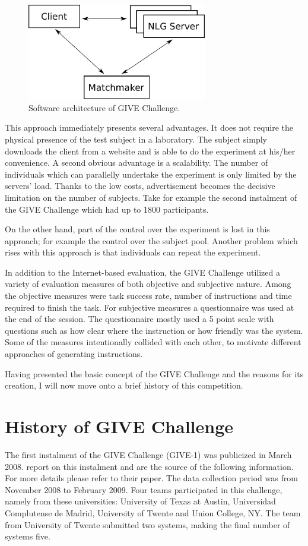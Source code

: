 \begin{figure}[!htbp]
  \centering
	\includegraphics[width=0.7\textwidth]{Images/give-client-servers}
	\caption{Software architecture of GIVE Challenge.}
	\label{fig:give-clientserver}
\end{figure}

This approach immediately presents several advantages. It does not require the physical presence of the test subject in a laboratory. The subject simply downloads the client from a website and is able to do the experiment at his/her convenience. A second obvious advantage is a scalability. The number of individuals which can parallelly undertake the experiment is only limited by the servers' load. Thanks to the low costs, advertisement becomes the decisive limitation on the number of subjects. Take for example the second instalment of the GIVE Challenge which had up to 1800 participants.

On the other hand, part of the control over the experiment is lost in this approach; for example the control over the subject pool. Another problem which rises with this approach is that individuals can repeat the experiment.

In addition to the Internet-based evaluation, the GIVE Challenge utilized a variety of evaluation measures of both objective and subjective nature. Among the objective measures were task success rate, number of instructions and time required to finish the task. For subjective measures a questionnaire was used at the end of the session. The questionnaire mostly used a 5 point scale with questions such as how clear where the instruction or how friendly was the system. Some of the measures intentionally collided with each other, to motivate different approaches of generating instructions.

Having presented the basic concept of the GIVE Challenge and the reasons for its creation, I will now move onto a brief history of this competition. 

 
\section{History of GIVE Challenge}
The first instalment of the GIVE Challenge (GIVE-1) was publicized in March 2008. \citet{koller2010first} report on this instalment and are the source of the following information. For more details please refer to their paper. The data collection period was from November 2008 to February 2009. Four teams participated in this challenge, namely from these universities: University of Texas at Austin, Universidad Complutense de Madrid, University of Twente and Union College, NY. The team from University of Twente submitted two systems, making the final number of systems five.

